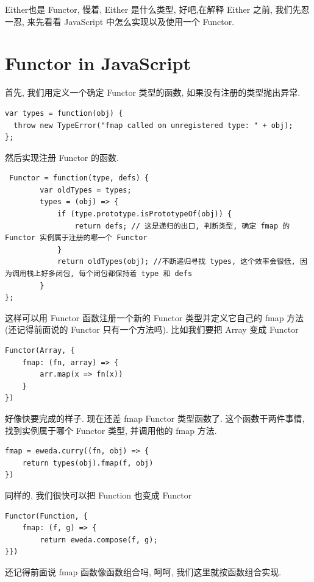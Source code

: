 \documentclass[a5paper]{book}
\begin{document}
Either也是 Functor, 慢着, Either 是什么类型, 好吧,在解释 Either 之前,
我们先忍一忍, 来先看看 JavaScript 中怎么实现以及使用一个 Functor.

\chapter{Functor in JavaScript}
\label{sec:orgheadline34}

首先, 我们用定义一个确定 Functor 类型的函数, 如果没有注册的类型抛出异常.

\begin{verbatim}
var types = function(obj) {
  throw new TypeError("fmap called on unregistered type: " + obj);
};
\end{verbatim}

然后实现注册 Functor 的函数.

\begin{verbatim}
 Functor = function(type, defs) {
        var oldTypes = types;
        types = (obj) => {
            if (type.prototype.isPrototypeOf(obj)) {
                return defs; // 这是递归的出口, 判断类型, 确定 fmap 的 Functor 实例属于注册的哪一个 Functor
            }
            return oldTypes(obj); //不断递归寻找 types, 这个效率会很低, 因为调用栈上好多闭包, 每个闭包都保持着 type 和 defs
        }
};
\end{verbatim}

这样可以用 Functor 函数注册一个新的 Functor 类型并定义它自己的 fmap
方法(还记得前面说的 Functor 只有一个方法吗). 比如我们要把 Array 变成
Functor

\begin{verbatim}
Functor(Array, {
    fmap: (fn, array) => {
        arr.map(x => fn(x))
    }
})
\end{verbatim}

好像快要完成的样子. 现在还差 fmap Functor 类型函数了.
这个函数干两件事情, 找到实例属于哪个 Functor 类型, 并调用他的 fmap 方法.

\begin{verbatim}
fmap = eweda.curry((fn, obj) => {
    return types(obj).fmap(f, obj)
})
\end{verbatim}

同样的, 我们很快可以把 Function 也变成 Functor

\begin{verbatim}
Functor(Function, {
    fmap: (f, g) => {
        return eweda.compose(f, g);
}})
\end{verbatim}

还记得前面说 fmap 函数像函数组合吗, 呵呵, 我们这里就按函数组合实现.
\end{document}
